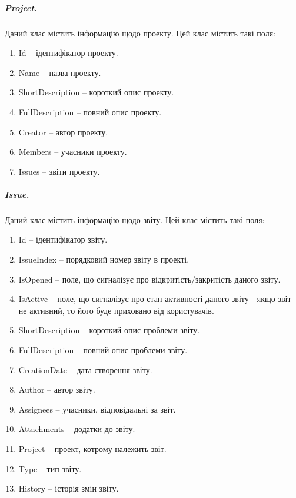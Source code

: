 \documentclass[../main.tex]{subfiles}
\begin{document}
		\subparagraph{Project.}
			Даний клас містить інформацію щодо проекту. Цей клас містить такі поля:
			\begin{enumerate}
				\item Id -- ідентифікатор проекту.
				\item Name -- назва проекту.
				\item ShortDescription -- короткий опис проекту.
				\item FullDescription -- повний опис проекту.
				\item Creator -- автор проекту.
				\item Members -- учасники проекту.
				\item Issues -- звіти проекту.
			\end{enumerate}

		\subparagraph{Issue.}
			Даний клас містить інформацію щодо звіту. Цей клас містить такі поля:
			\begin{enumerate}
				\item Id -- ідентифікатор звіту.
				\item IssueIndex -- порядковий номер звіту в проекті.
				\item IsOpened -- поле, що сигналізує про відкритість/закритість даного звіту.
				\item IsActive -- поле, що сигналізує про стан активності даного звіту - якщо звіт не активний, то його буде приховано від користувачів.
				\item ShortDescription -- короткий опис проблеми звіту.
				\item FullDescription -- повний опис проблеми звіту.
				\item CreationDate -- дата створення звіту.
				\item Author -- автор звіту.
				\item Assignees -- учасники, відповідальні за звіт.
				\item Attachments -- додатки до звіту.
				\item Project -- проект, котрому належить звіт.
				\item Type -- тип звіту.
				\item History -- історія змін звіту.
			\end{enumerate}

		
\end{document}
